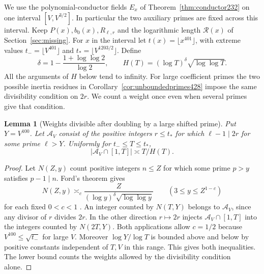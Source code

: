 \documentclass[a4paper,11pt]{article}
\newtheorem{lemma}[proposition]{Lemma}
\theoremstyle{definition}
\theoremstyle{remark}
\numberwithin{equation}{section}
\begin{document}
We use the polynomial-conductor fields \(E_x\) of
Theorem~\ref{thm:conductor232} on one interval \([V,V^{3/2}]\).
In particular the two auxiliary primes are fixed across this
interval. Keep \(P(x),b_0(x),R_{\ell,r}\) and the logarithmic
length \(\mathcal R(x)\) of Section~\ref{sec:missing}. For
\(x\) in the interval let \(t(x)=\lfloor x^{401}\rfloor\), with
extreme values \(t_-=\lfloor V^{401}\rfloor\) and
\(t_*=\lfloor V^{1203/2}\rfloor\). Define
\[
 \delta=1-\frac{1+\log\log 2}{\log 2},\qquad
 H(T)=(\log T)^\delta\sqrt{\log\log T}.
\]
All the arguments of \(H\) below tend to infinity. For large
coefficient primes the two possible inertia residues in
Corollary~\ref{cor:unboundedprimes428} impose the same divisibility
condition on \(2r\). We count a weight once even when several primes
give that condition.

\begin{lemma}[Weights divisible after doubling by a large shifted prime]\leavevmode
\label{lem:shiftdivisors465}
Put \(Y=V^{100}\). Let \(\mathcal A_V\) consist of the positive
integers \(r\le t_*\) for which \(\ell-1\mid 2r\) for some prime
\(\ell>Y\). Uniformly for \(t_-\le T\le t_*\),
\[
                  |\mathcal A_V\cap[1,T]|\asymp T/H(T).
\]
\end{lemma}
\begin{proof}
Let \(N(Z,y)\) count positive integers \(n\le Z\) for which some
prime \(p>y\) satisfies \(p-1\mid n\). Ford's theorem gives
\[
  N(Z,y)\asymp_c
       \frac{Z}{(\log y)^\delta\sqrt{\log\log y}}
         \qquad(3\le y\le Z^{1-c})
\]
for each fixed \(0<c<1\) \cite[Theorem~1(i)]{I-I-ford465}.
An integer counted by \(N(T,Y)\) belongs to \(\mathcal A_V\),
since any divisor of \(r\) divides \(2r\). In the other direction
\(r\mapsto 2r\) injects \(\mathcal A_V\cap[1,T]\) into the
integers counted by \(N(2T,Y)\). Both applications allow
\(c=1/2\) because \(V^{100}\le \sqrt{t_-}\) for large \(V\).
Moreover \(\log Y/\log T\) is bounded above and below by
positive constants independent of \(T,V\) in this range. This
gives both inequalities. The lower bound counts the weights
allowed by the divisibility condition alone.
\end{proof}
\end{document}
